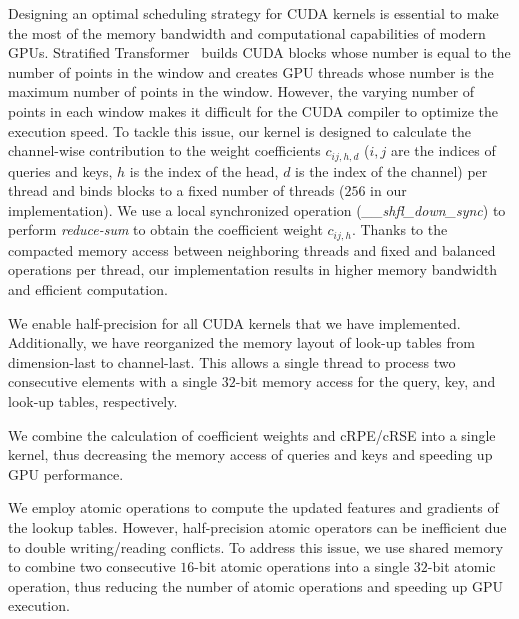 \documentclass[10pt,twocolumn,letterpaper]{article}
\begin{document}
Designing an optimal scheduling strategy for CUDA kernels is essential to make the most of the memory bandwidth and computational capabilities of modern GPUs. Stratified Transformer~\cite{lai2022stratified} builds CUDA blocks whose number is equal to the number of points in the window and creates GPU threads whose number is the maximum number of points in the window. However, the varying number of points in each window makes it difficult for the CUDA compiler to optimize the execution speed. To tackle this issue, our kernel is designed to calculate the channel-wise contribution to the weight coefficients $c_{ij,h,d}$ ($i,j$ are the indices of queries and keys, $h$ is the index of the head, $d$ is the index of the channel) per thread and binds blocks to a fixed number of threads ($256$ in our implementation). We use a local synchronized operation (\textit{\_\_shfl\_down\_sync}) to perform \textit{reduce-sum} to obtain the coefficient weight $c_{ij,h}$. Thanks to the compacted memory access between neighboring threads and fixed and balanced operations per thread, our implementation results in higher memory bandwidth and efficient computation.

 We enable half-precision for all CUDA kernels that we have implemented. Additionally, we have reorganized the memory layout of look-up tables from dimension-last to channel-last. This allows a single thread to process two consecutive elements with a single $32$-bit memory access for the query, key, and look-up tables, respectively.

 We combine the calculation of coefficient weights and cRPE/cRSE into a single kernel, thus decreasing the memory access of queries and keys and speeding up GPU performance.

 We employ atomic operations to compute the updated features and gradients of the lookup tables. However, half-precision atomic operators can be inefficient due to double writing/reading conflicts. To address this issue, we use shared memory to combine two consecutive $16$-bit atomic operations into a single $32$-bit atomic operation, thus reducing the number of atomic operations and speeding up GPU execution.  
\end{document}
